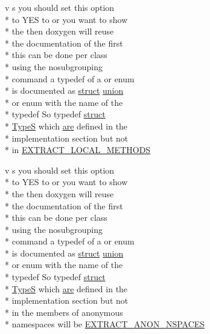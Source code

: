 \begin{DoxyCompactItemize}
v s you should set this option \\*
to Y\-E\-S to or you want to show \\*
the then doxygen will reuse \\*
the documentation of the first \\*
this can be done per class \\*
using the nosubgrouping \\*
command a typedef of a or enum \\*
is documented as \hyperlink{mkdoc_8dox_aba655c5729da86df745f0c8e7f9ba8d2}{struct} \hyperlink{mkdoc_8dox_a68000add3c95d09ceb97c3079515907d}{union} \\*
or enum with the name of the \\*
typedef So typedef \hyperlink{mkdoc_8dox_aba655c5729da86df745f0c8e7f9ba8d2}{struct} \\*
\hyperlink{mkdoc_8dox_a25dd1c015abaf1e4f2c6879012f4f170}{Type\-S} which \hyperlink{mkdoc_8dox_a6d0965b20c4eb2235e8f9f5f0e5193ae}{are} defined in the \\*
implementation section but not \\*
in \hyperlink{mkdoc_8dox_a7274082691ced043d976dbd8b0e8c608}{E\-X\-T\-R\-A\-C\-T\-\_\-\-L\-O\-C\-A\-L\-\_\-\-M\-E\-T\-H\-O\-D\-S}
\item 
v s you should set this option \\*
to Y\-E\-S to or you want to show \\*
the then doxygen will reuse \\*
the documentation of the first \\*
this can be done per class \\*
using the nosubgrouping \\*
command a typedef of a or enum \\*
is documented as \hyperlink{mkdoc_8dox_aba655c5729da86df745f0c8e7f9ba8d2}{struct} \hyperlink{mkdoc_8dox_a68000add3c95d09ceb97c3079515907d}{union} \\*
or enum with the name of the \\*
typedef So typedef \hyperlink{mkdoc_8dox_aba655c5729da86df745f0c8e7f9ba8d2}{struct} \\*
\hyperlink{mkdoc_8dox_a25dd1c015abaf1e4f2c6879012f4f170}{Type\-S} which \hyperlink{mkdoc_8dox_a6d0965b20c4eb2235e8f9f5f0e5193ae}{are} defined in the \\*
implementation section but not \\*
in the members of anonymous \\*
namespaces will be \hyperlink{mkdoc_8dox_a7e1f20bfa451cb50f83a07ffe19863e7}{E\-X\-T\-R\-A\-C\-T\-\_\-\-A\-N\-O\-N\-\_\-\-N\-S\-P\-A\-C\-E\-S}

\end{DoxyCompactItemize}
